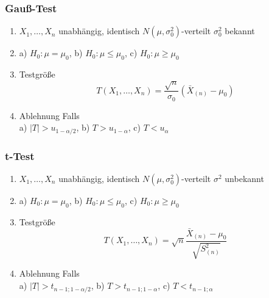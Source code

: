 \documentclass[
	ngerman,
	accentcolor=9c,%
	type=intern,
	marginpar=false
	]{tudapub}
\begin{document}
                \subsubsection*{Gauß-Test}
                     \begin{enumerate}
                         \item $X_1,\dots,X_n$ unabhängig, identisch $N(\mu, \sigma^2_0)$-verteilt $\sigma^2_0$ bekannt
                         \item a) $H_0: \mu = \mu_0$, b) $H_0: \mu \leq \mu_0$, c) $H_0: \mu \geq \mu_0$     
                         \item Testgröße
                         \begin{equation*}
                             T(X_1,\dots,X_n)=\dfrac{\sqrt{n}}{\sigma_0}(\bar{X}_{(n)}-\mu_0)
                         \end{equation*} 
                         \item Ablehnung Falls\\
                               a) $|T| > u_{1-\alpha/2}$, b) $T > u_{1-\alpha}$, c) $T < u_{\alpha}$
                     \end{enumerate}
                \subsubsection*{t-Test}
                     \begin{enumerate}
                         \item $X_1,\dots,X_n$ unabhängig, identisch $N(\mu, \sigma^2_0)$-verteilt $\sigma^2$ unbekannt
                         \item a) $H_0: \mu = \mu_0$, b) $H_0: \mu \leq \mu_0$, c) $H_0: \mu \geq \mu_0$     
                         \item Testgröße
                         \begin{equation*}
                             T(X_1,\dots,X_n)=\sqrt{n}\dfrac{\bar{X}_{(n)}-\mu_0}{\sqrt{S_{(n)}^2}}
                         \end{equation*} 
                         \item Ablehnung Falls\\
                               a) $|T| > t_{n-1;1-\alpha/2}$, b) $T > t_{n-1;1-\alpha}$, c) $T < t_{n-1;\alpha}$
                     \end{enumerate}
\end{document}
